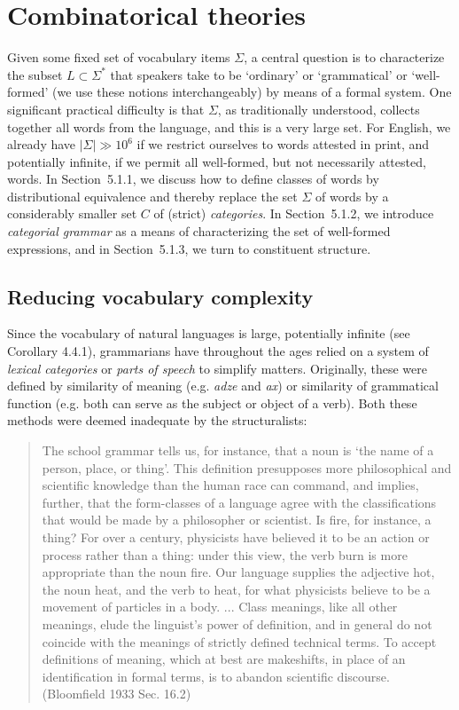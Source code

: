 \section{Combinatorical theories} 

Given some fixed set of vocabulary items $\Sigma$, a central question is to
characterize the subset $L \subset \Sigma^*$ that speakers take to be
`ordinary' or `grammatical' or `well-formed' (we use these notions
interchangeably) by means of a formal system. One significant practical
difficulty is that $\Sigma$, as traditionally understood, collects together
all words from the language, and this is a very large set. For English, we
already have $| \Sigma | \gg 10^6$ if we restrict ourselves to words attested
in print, and potentially infinite, if we permit all well-formed, but not
necessarily attested, words. In Section~5.1.1, we discuss how to define classes
of words by distributional equivalence and thereby replace the set $\Sigma$ of
words by a considerably smaller set $C$ of (strict) {\it categories}. In
Section~5.1.2, we introduce {\it categorial grammar} as a means of
characterizing the set of well-formed expressions, and in Section~5.1.3, we
turn to constituent structure.  

\subsection{Reducing vocabulary complexity}

Since the vocabulary of natural languages is large, potentially infinite (see
Corollary 4.4.1), grammarians have throughout the ages relied on a system of
{\it lexical categories} or {\it parts of speech} to simplify matters.
  Originally, these were
defined by similarity of meaning (e.g. {\it adze} and {\it ax}) or similarity
of grammatical function (e.g. both can serve as the subject or object of a
verb).  Both these methods were deemed inadequate by the structuralists:

\begin{quote} 
The school grammar tells us, for instance, that a noun is `the name of a
person, place, or thing'. This definition presupposes more philosophical and
scientific knowledge than the human race can command, and implies, further,
that the form-classes of a language agree with the classifications that would
be made by a philosopher or scientist. Is fire, for instance, a thing? For
over a century, physicists have believed it to be an action or process rather
than a thing: under this view, the verb burn is more appropriate than the noun
fire. Our language supplies the adjective hot, the noun heat, and the verb to
heat, for what physicists believe to be a movement of particles in a body.
... Class meanings, like all other meanings, elude the linguist's power of
definition, and in general do not coincide with the meanings of strictly
defined technical terms. To accept definitions of meaning, which at best are
makeshifts, in place of an identification in formal terms, is to abandon
scientific discourse.  (Bloomfield 1933 Sec. 16.2)
\end{quote}

